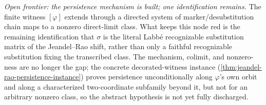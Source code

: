 \begin{theorem}\label{thm:jeandel-rao-persistence}\notready{}
\emph{Open frontier: the persistence mechanism is built; one identification
remains.} The finite witness $[\varphi]$ extends through a directed system of
marker/desubstitution chain maps to a nonzero direct-limit class. What keeps
this node red is the remaining identification that $\sigma$ is the literal
Labb\'e recognizable substitution matrix of the Jeandel--Rao shift, rather
than only a faithful recognizable substitution fixing the transcribed class.
The mechanism, colimit, and nonzero-ness are no longer the gap; the concrete
decorated-witness instance (\cref{thm:jeandel-rao-persistence-instance}) proves
persistence unconditionally along $\varphi$'s own orbit and along a
characterized two-coordinate subfamily beyond it, but not for an arbitrary
nonzero class, so the abstract hypothesis is not yet fully discharged.
\end{theorem}
